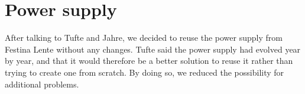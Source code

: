 \section {Power supply}

After talking to Tufte and Jahre, we decided to reuse the power supply
from Festina Lente without any changes. Tufte said the power supply had evolved year by
year, and that it would therefore be a better solution to reuse it rather
than trying to create one from scratch. By doing so, we reduced the possibility 
for additional problems.
